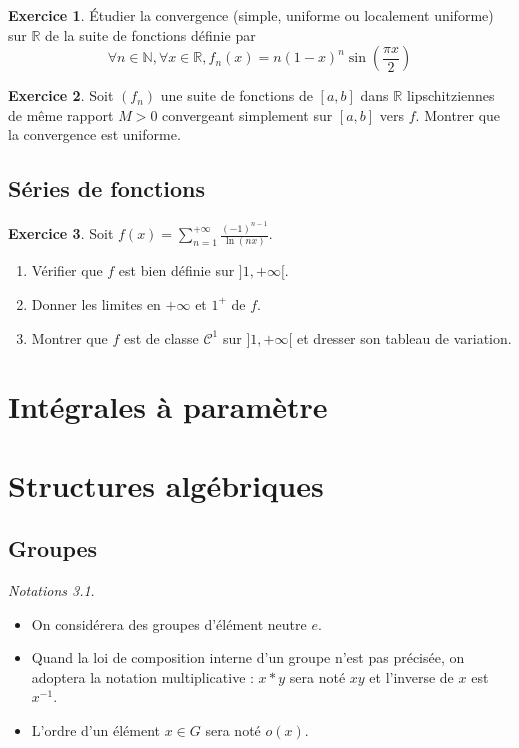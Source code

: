 \documentclass[12pt,a4paper]{book}
\theoremstyle{definition}
\newtheorem{exo}{Exercice}[section]
\theoremstyle{remark}
\newtheorem*{notation}{Notations}
\newcommand{\N}{\mathbb{N}}
\newcommand{\R}{\mathbb{R}}
\newcommand{\cont}{\mathcal{C}}
\begin{document}
\begin{exo}
    Étudier la convergence (simple, uniforme ou localement uniforme) sur $\R$ de la suite de fonctions définie par
    \[\forall n \in \N, \forall x \in \R, f_n (x) = n (1-x)^n \sin \left(\frac{\pi x}{2}\right)\]
\end{exo}

\begin{exo}
    Soit $(f_n)$ une suite de fonctions de $[a,b]$ dans $\R$ lipschitziennes de même rapport $M > 0$ convergeant simplement sur $[a,b]$ vers $f$. Montrer que la convergence est uniforme.
\end{exo}

\section{Séries de fonctions}

\begin{exo}
    Soit $\displaystyle f(x) = \sum_{n=1}^{+\infty} \frac{(-1)^{n-1}}{\ln(nx)}$.

    \begin{enumerate}
        \item Vérifier que $f$ est bien définie sur $]1, +\infty[$.
        \item Donner les limites en $+\infty$ et $1^+$ de $f$.
        \item Montrer que $f$ est de classe $\cont^1$ sur $]1, +\infty[$ et dresser son tableau de variation.
    \end{enumerate}
\end{exo}

\chapter{Intégrales à paramètre}

\chapter{Structures algébriques}

\section{Groupes}

\begin{notation}
\hspace{1pt}
\begin{itemize}
    \item On considérera des groupes d'élément neutre $e$.
    \item Quand la loi de composition interne d'un groupe n'est pas précisée, on adoptera la notation multiplicative : $x * y$ sera noté $xy$ et l'inverse de $x$ est $x^{-1}$.
    \item L'ordre d'un élément $x\in G$ sera noté $o(x)$.
\end{itemize}
\end{notation}
\end{document}
